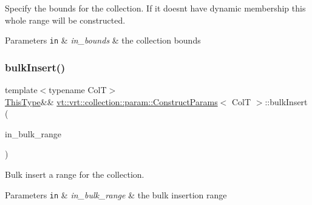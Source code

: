 Specify the bounds for the collection. If it doesn\textquotesingle{}t have dynamic membership this whole range will be constructed. 


\begin{DoxyParams}[1]{Parameters}
\mbox{\tt in}  & {\em in\+\_\+bounds} & the collection bounds \\
\hline
\end{DoxyParams}
\mbox{\label{structvt_1_1vrt_1_1collection_1_1param_1_1_construct_params_af03cf3f305c56e36de87c537e8356f0a}} 
\subsubsection{\texorpdfstring{bulk\+Insert()}{bulkInsert()}\hspace{0.1cm}{\footnotesize\ttfamily [1/2]}}
{\footnotesize\ttfamily template$<$typename ColT$>$ \\
\hyperlink{structvt_1_1vrt_1_1collection_1_1param_1_1_construct_params_a13d4910c0f6825c7b0ddfebce5288bea}{This\+Type}\&\& \hyperlink{structvt_1_1vrt_1_1collection_1_1param_1_1_construct_params}{vt\+::vrt\+::collection\+::param\+::\+Construct\+Params}$<$ ColT $>$\+::bulk\+Insert (\begin{DoxyParamCaption}\item[{\hyperlink{structvt_1_1vrt_1_1collection_1_1param_1_1_construct_params_a7bc8d5d57e377e0f2e60031582eeb7e6}{Index\+Type}}]{in\+\_\+bulk\+\_\+range }\end{DoxyParamCaption})\hspace{0.3cm}{\ttfamily [inline]}}



Bulk insert a range for the collection. 


\begin{DoxyParams}[1]{Parameters}
\mbox{\tt in}  & {\em in\+\_\+bulk\+\_\+range} & the bulk insertion range \\
\hline
\end{DoxyParams}
\mbox{\label{structvt_1_1vrt_1_1collection_1_1param_1_1_construct_params_abf7e7faa810ea7d6c3a3abf0ad732a01}} 
